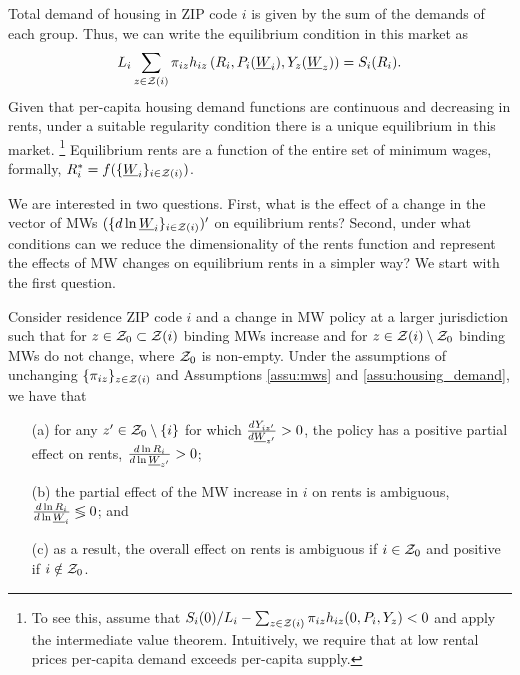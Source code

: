Total demand of housing in ZIP code $i$ is given by the sum of the demands of 
each group.
Thus, we can write the equilibrium condition in this market as
\begin{equation}\label{eq:equilibrium}
	L_i \sum_{z\in\mathcal{Z}(i)} \pi_{iz} h_{iz} \left(R_i, P_i(\underline{W}_i), Y_z(\underline{W}_z)\right) = S_i(R_i) .
\end{equation}
Given that per-capita housing demand functions are continuous and decreasing 
in rents, under a suitable regularity condition there is a unique equilibrium 
in this market.%
\footnote{To see this, assume that 
$S_i(0)/L_i - \sum_{z\in\mathcal{Z}(i)} \pi_{iz} h_{iz} (0, P_i, Y_z) < 0$
and apply the intermediate value theorem.
Intuitively, we require that at low rental prices per-capita demand exceeds 
per-capita supply.}
Equilibrium rents are a function of the entire set of minimum wages, formally, 
$R^*_i = f(\{\underline{W}_i\}_{i\in\mathcal{Z}(i)})$.

We are interested in two questions.
First, what is the effect of a change in the vector of MWs 
$(\{d \ln \underline{W}_i\}_{i\in\mathcal{Z}(i)})'$ on equilibrium rents?
Second, under what conditions can we reduce the dimensionality of the rents 
function and represent the effects of MW changes on equilibrium rents in a 
simpler way?
We start with the first question.

\begin{prop}\label{prop:comparative_statics}
    Consider residence ZIP code $i$ and a change in MW policy at a larger
    jurisdiction such that for $z\in\mathcal{Z}_0 \subset \mathcal{Z}(i)$ binding MWs increase 
    and for $z\in\mathcal{Z}(i)\setminus \mathcal{Z}_0$ binding MWs do not change,
    where $\mathcal{Z}_0$ is non-empty.
    Under the assumptions of unchanging $\{\pi_{iz}\}_{z\in\mathcal{Z}(i)}$ 
    and Assumptions \ref{assu:mws} and \ref{assu:housing_demand},
    we have that
    \begin{enumerate}
        \item[(a)]
        for any $z'\in\mathcal{Z}_0\setminus\{i\}$ for which $\frac{d Y_{iz'}}{d \underline{W}_{z'}}>0$, 
        the policy has a positive partial effect on rents, 
        $\frac{d\ln R_i}{d\ln\underline{W}_{z'}} > 0$;
        \item[(b)]
        the partial effect of the MW increase in $i$ on rents is ambiguous, 
        $\frac{d\ln R_i}{d\ln\underline{W}_i} \lessgtr 0$; and
        \item[(c)]
        as a result, the overall effect on rents is ambiguous if $i\in\mathcal{Z}_0$ 
        and positive if $i\notin\mathcal{Z}_0$.
    \end{enumerate}
\end{prop}

